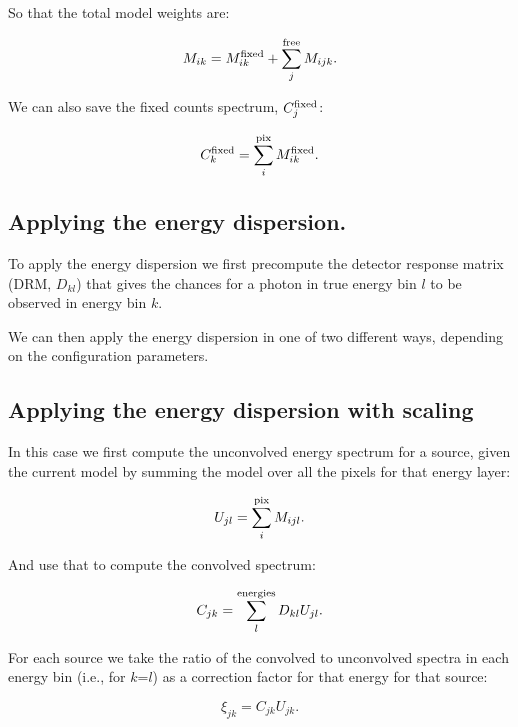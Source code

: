 \documentclass[preprint]{aastex}
\begin{document}
\noindent So that the total model weights are:

\begin{equation}
  M_{ik} = M_{ik}^{\rm fixed} + \sum_j^{\rm free} M_{ijk}.
\end{equation}

We can also save the fixed counts spectrum, $C_{j}^{\rm fixed}$:

\begin{equation}
  C_{k}^{\rm fixed} = \sum_i^{\rm pix} M_{ik}^{\rm fixed}.
\end{equation}




\subsection{Applying the energy dispersion.}\label{subsec:like_model_edisp}

To apply the energy dispersion we first precompute the detector
response matrix (DRM, $D_{kl}$) that gives the chances for a photon in
true energy bin $l$ to be observed in energy bin $k$.  

We can then apply the energy dispersion in one of two different ways, 
depending on the configuration parameters.


\subsection{Applying the energy dispersion with scaling}\label{subsec:like_model_edisp_0}

In this case we first compute the unconvolved energy spectrum for a source, given the current model
by summing the model over all the pixels for that energy layer:

\begin{equation}
  U_{jl} = \sum_i^{\rm pix} M_{ijl}.
\end{equation}

\noindent And use that to compute the convolved spectrum:

\begin{equation}
  C_{jk} = \sum_l^{\rm energies} D_{kl} U_{jl}.
\end{equation}

For each source we take the ratio of the convolved to unconvolved
spectra in each energy bin (i.e., for $k$=$l$) as a correction factor
for that energy for that source:

\begin{equation}
  \xi_{jk} = C_{jk} U_{jk}.
\end{equation}
\end{document}
